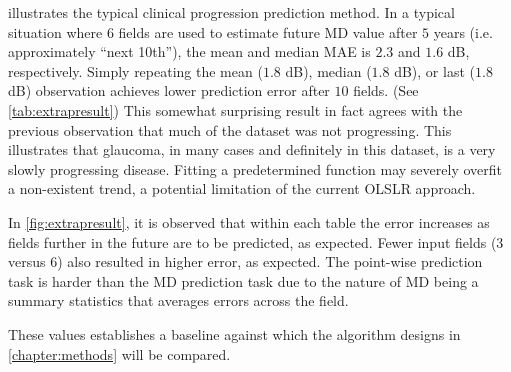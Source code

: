  illustrates the typical clinical progression prediction method. In a typical situation where $6$ fields are used to estimate future MD value after $5$ years (i.e. approximately ``next 10th''), the mean and median \ac{MAE} is $2.3$ and $1.6$ dB, respectively. Simply repeating the mean ($1.8$ dB), median ($1.8$ dB), or last ($1.8$ dB) observation achieves lower prediction error after $10$ fields. (See \cref{tab:extrapresult}) This somewhat surprising result in fact agrees with the previous observation that much of the dataset was not progressing. This illustrates that glaucoma, in many cases and definitely in this dataset, is a very slowly progressing disease. Fitting a predetermined function may severely overfit a non-existent trend, a potential limitation of the current \ac{OLSLR} approach. 

In \cref{fig:extrapresult}, it is observed that within each table the error increases as fields further in the future are to be predicted, as expected. Fewer input fields ($3$ versus $6$) also resulted in higher error, as expected. The point-wise prediction task is harder than the MD prediction task due to the nature of MD being a summary statistics that averages errors across the field. 

These values establishes a baseline against which the algorithm designs in \cref{chapter:methods} will be compared. 
